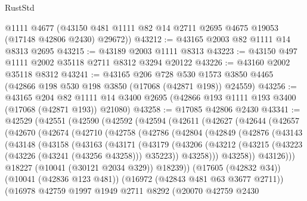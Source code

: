 \begin{lexlean}{RustStd}
\begin{coremodule}
      @1111
      @4677
      (@43150 @481 @1111 @82 @14 @2711 @2695 @4675 @19053 (@17148 @42806 @2430) @29672))
@43212 := @43165 @2003 @82 @1111 @14 @8313 @2695
@43215 := @43189 @2003 @1111 @8313
@43223 := @43150 @497 @1111 @2002 @35118 @2711 @8312 @3294 @20122
@43226 := @43160 @2002 @35118 @8312
@43241 := @43165
    @206
    @728
    @530
    @1573
    @3850
    @4465
    (@42866 @198 @530 @198 @3850 (@17068 (@42871 @198)) @24559)
@43256 := @43165
    @204
    @82
    @1111
    @14
    @3400
    @2695
    (@42866 @193 @1111 @193 @3400 (@17068 (@42871 @193)) @21080)
@43258 := @17085 @42806 @2430
@43341 := @42529
    (@42551
      (@42590
        (@42592
          (@42594
            (@42611
              (@42627
                (@42644
                  (@42657
                    (@42670
                      (@42674
                        (@42710
                          (@42758
                            (@42786
                              (@42804
                                (@42849
                                  (@42876
                                    (@43143
                                      (@43148
                                        (@43158
                                          (@43163
                                            (@43171
                                              (@43179
                                                (@43206
                                                  (@43212
                                                    (@43215
                                                      (@43223
                                                        (@43226 (@43241 (@43256 @43258)))
                                                        @35223))
                                                    @43258)))
                                              @43258))
                                          @43126)))
                                    @18227
                                    (@10041 (@30121 @2034 @329))
                                    @18239))
                                (@17605 (@42832 @34))
                                (@10041 (@42836 @123 @481))
                                (@16972 (@42843 @481 @63 @3677 @2711))
                                (@16978
                                  @42759
                                  @1997
                                  @1949
                                  @2711
                                  @8292
                                  (@20070
                                    @42759
                                    @2430

\end{coremodule}
\end{lexlean}
